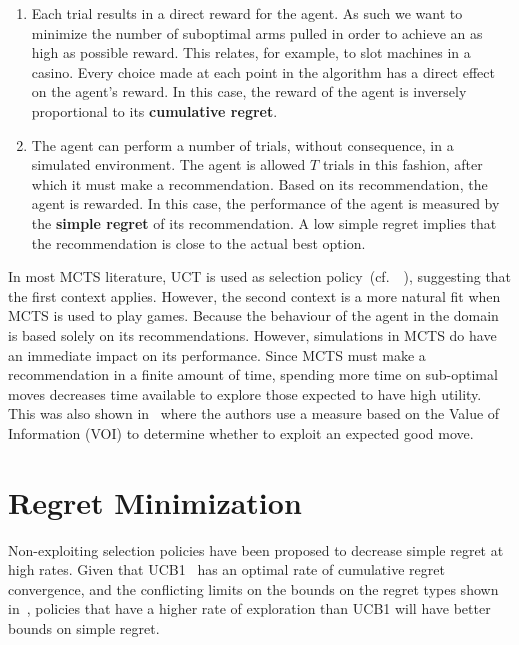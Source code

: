\documentclass[a4paper]{llncs}
\newcommand{\cf}{{cf.}~}
\begin{document}
\begin{enumerate}

\item Each trial results in a direct reward for the agent. As such we want to minimize the number of suboptimal arms pulled in order to achieve an as high as possible reward. This relates, for example, to slot machines in a casino. Every choice made at each point in the algorithm has a direct effect on the agent's reward. In this case, the reward of the agent is inversely proportional to its \textbf{cumulative regret}.

\item The agent can perform a number of trials, without consequence, in a simulated environment. The agent is allowed $T$ trials in this fashion, after which it must make a recommendation. Based on its recommendation, the agent is rewarded. In this case, the performance of the agent is measured by the \textbf{simple regret} of its recommendation. A low simple regret implies that the recommendation is close to the actual best option.

\end{enumerate}

In most MCTS literature, UCT is used as selection policy~(\cf~\cite{browne2012survey}), suggesting that the first context applies. However, the second context is a more natural fit when MCTS is used to play games. Because the behaviour of the agent in the domain is based solely on its recommendations. 
However, simulations in MCTS do have an immediate impact on its performance. Since MCTS must make a recommendation in a finite amount of time, spending more time on sub-optimal moves decreases time available to explore those expected to have high utility. This was also shown in~\cite{tolpin2012mcts} where the authors use a measure based on the Value of Information (VOI) to determine whether to exploit an expected good move.

\section{Regret Minimization}
\label{sec:reg_min}

Non-exploiting selection policies have been proposed to decrease simple regret at high rates. Given that UCB1~\cite{auer2002using} has an optimal rate of cumulative regret convergence, and the conflicting limits on the bounds on the regret types shown in~\cite{Bubeck11Pure}, policies that have a higher rate of exploration than UCB1 will have better bounds on simple regret.
\end{document}

